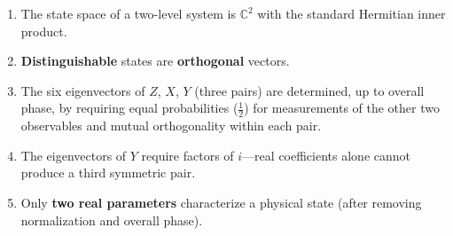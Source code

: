\documentclass[12pt,a4paper]{article}
\begin{document}
\begin{enumerate}[nosep]
    \item The state space of a two-level system is $\mathbb{C}^2$ with the standard Hermitian inner product.
    \item \textbf{Distinguishable} states are \textbf{orthogonal} vectors.
    \item The six eigenvectors of $Z$, $X$, $Y$ (three pairs) are determined, up to overall phase, by requiring equal probabilities ($\frac{1}{2}$) for measurements of the other two observables and mutual orthogonality within each pair.
    \item The eigenvectors of $Y$ require factors of $i$---real coefficients alone cannot produce a third symmetric pair.
    \item Only \textbf{two real parameters} characterize a physical state (after removing normalization and overall phase).
\end{enumerate}
\end{document}
